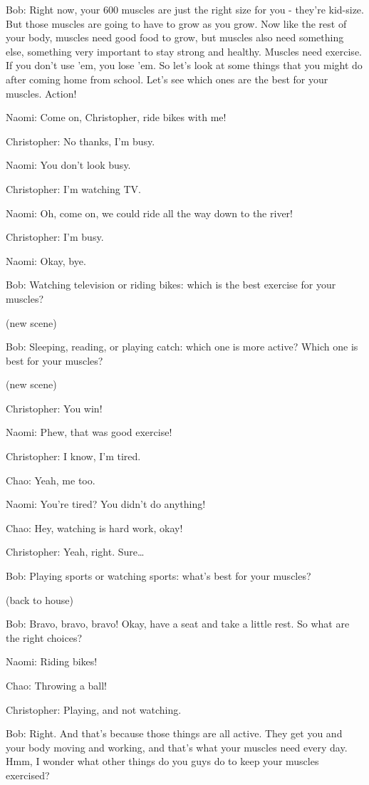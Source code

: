 Bob: Right now, your 600 muscles are just the right size for you - they're kid-size. But those muscles are going to have to grow as you grow. Now like the rest of your body, muscles need good food to grow, but muscles also need something else, something very important to stay strong and healthy. Muscles need exercise. If you don't use 'em, you lose 'em. So let's look at some things that you might do after coming home from school. Let's see which ones are the best for your muscles. Action!

Naomi: Come on, Christopher, ride bikes with me!

Christopher: No thanks, I'm busy.

Naomi: You don't look busy.

Christopher: I'm watching TV.

Naomi: Oh, come on, we could ride all the way down to the river!

Christopher: I'm busy.

Naomi: Okay, bye.

Bob: Watching television or riding bikes: which is the best exercise for your muscles?

(new scene)

Bob: Sleeping, reading, or playing catch: which one is more active? Which one is best for your muscles?

(new scene)

Christopher: You win!

Naomi: Phew, that was good exercise!

Christopher: I know, I'm tired.

Chao: Yeah, me too.

Naomi: You're tired? You didn't do anything!

Chao: Hey, watching is hard work, okay!

Christopher: Yeah, right. Sure\dots

Bob: Playing sports or watching sports: what's best for your muscles?

(back to house)

Bob: Bravo, bravo, bravo! Okay, have a seat and take a little rest. So what are the right choices?

Naomi: Riding bikes!

Chao: Throwing a ball!

Christopher: Playing, and not watching.

Bob: Right. And that's because those things are all active. They get you and your body moving and working, and that's what your muscles need every day. Hmm, I wonder what other things do you guys do to keep your muscles exercised?

